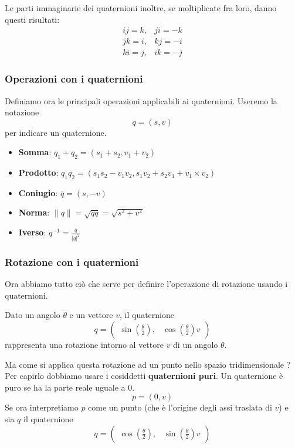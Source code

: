 Le parti immaginarie dei quaternioni inoltre, se moltiplicate fra loro, danno questi risultati:
\[
	\begin{array}{lr}
		ij = k, & ji = -k \\
		jk = i, & kj = -i \\
		ki = j, & ik = -j
	\end{array}
\]
\subsubsection{Operazioni con i quaternioni}
Definiamo ora le principali operazioni applicabili ai quaternioni. Useremo la notazione
\[ q = (s, v) \]
per indicare un quaternione.
\begin{itemize}
	\item \textbf{Somma}: $q_1 + q_2 = (s_1 + s_2, v_1 + v_2)$
	\item \textbf{Prodotto}: $q_1 q_2 = (s_1 s_2 - v_1 v_2, s_1 v_2 + s_2 v_1 + v_1 \times v_2)$
	\item \textbf{Coniugio}: $\overline{q} = (s, -v)$
	\item \textbf{Norma}: $\| q \| = \sqrt{\overline{q} q} = \sqrt{s^2 + v^2}$
	\item \textbf{Iverso}: $q^{-1} = \displaystyle\frac{\overline{q}}{|q|^2}$
\end{itemize}

\subsubsection{Rotazione con i quaternioni}
Ora abbiamo tutto ci\`o che serve per definire l'operazione di rotazione usando i quaternioni.

Dato un angolo $\theta$ e un vettore $v$, il quaternione
\[
	q = \begin{pmatrix} \sin{ \left( \displaystyle\frac{\theta}{2} \right) },
		 & \cos{ \left( \displaystyle\frac{\theta}{2} \right) } v\end{pmatrix}
\]
rappresenta una rotazione intorno al vettore $v$ di un angolo $\theta$.

Ma come si applica questa rotazione ad un punto nello spazio tridimensionale ? Per capirlo dobbiamo usare i cosiddetti
\textbf{quaternioni puri}. Un quaternione \`e puro se ha la parte reale uguale a 0.
\[ p = (0, v) \]
Se ora interpretiamo $p$ come un punto (che \`e l'origine degli assi traslata di $v$) e sia $q$ il quaternione
\[
	q = \begin{pmatrix}
		\cos{\left( \displaystyle\frac{\theta}{2} \right) },
		 & \sin{ \left( \displaystyle\frac{\theta}{2} \right) v}
	\end{pmatrix}
\]